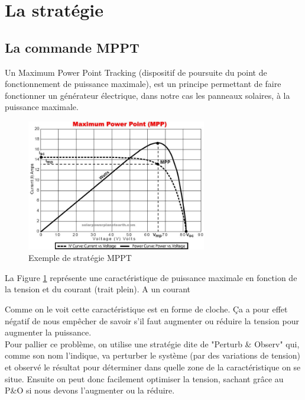  
\section{La stratégie}

\subsection{La commande MPPT}
Un Maximum Power Point Tracking (dispositif de poursuite du point de fonctionnement de puissance maximale), est un principe permettant de faire fonctionner un générateur électrique, dans notre cas les panneaux solaires, à la puissance maximale.

\begin{figure}[ht]
	\begin{center}
	\includegraphics[width=0.7\textwidth]{images/MPPT.jpeg}
	\caption{Exemple de stratégie MPPT}\label{img:courbe MPPT}
	\end{center}
\end{figure}
\FloatBarrier 

La Figure \ref{img:courbe MPPT} représente une caractéristique de puissance maximale en fonction de la tension et du courant (trait plein). A un courant 

Comme on le voit cette caractéristique est en forme de cloche. Ça a pour effet négatif de nous empêcher de savoir s'il faut augmenter ou réduire la tension pour augmenter la puissance.\\
Pour pallier ce problème, on utilise une stratégie dite de "Perturb \& Observ" qui, comme son nom l'indique, va perturber le système (par des variations de tension) et observé le résultat pour déterminer dans quelle zone de la caractéristique on se situe. Ensuite on peut donc facilement optimiser la tension, sachant grâce au P\&O si nous devons l'augmenter ou la réduire.\\

